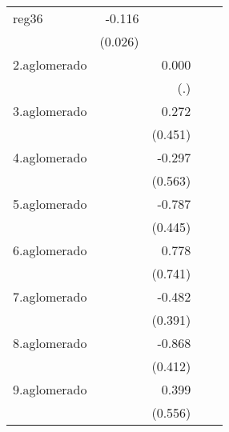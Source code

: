 {\begin{longtable}{l*{4}{D{.}{.}{-1}}}
\addlinespace
reg36       &      -0.116\sym{***}&                     &                     &                     \\
            &     (0.026)         &                     &                     &                     \\
\addlinespace
2.aglomerado&                     &       0.000         &                     &                     \\
            &                     &         (.)         &                     &                     \\
\addlinespace
3.aglomerado&                     &       0.272         &                     &                     \\
            &                     &     (0.451)         &                     &                     \\
\addlinespace
4.aglomerado&                     &      -0.297         &                     &                     \\
            &                     &     (0.563)         &                     &                     \\
\addlinespace
5.aglomerado&                     &      -0.787         &                     &                     \\
            &                     &     (0.445)         &                     &                     \\
\addlinespace
6.aglomerado&                     &       0.778         &                     &                     \\
            &                     &     (0.741)         &                     &                     \\
\addlinespace
7.aglomerado&                     &      -0.482         &                     &                     \\
            &                     &     (0.391)         &                     &                     \\
\addlinespace
8.aglomerado&                     &      -0.868\sym{*}  &                     &                     \\
            &                     &     (0.412)         &                     &                     \\
\addlinespace
9.aglomerado&                     &       0.399         &                     &                     \\
            &                     &     (0.556)         &                     &                     \\

\end{longtable}}
